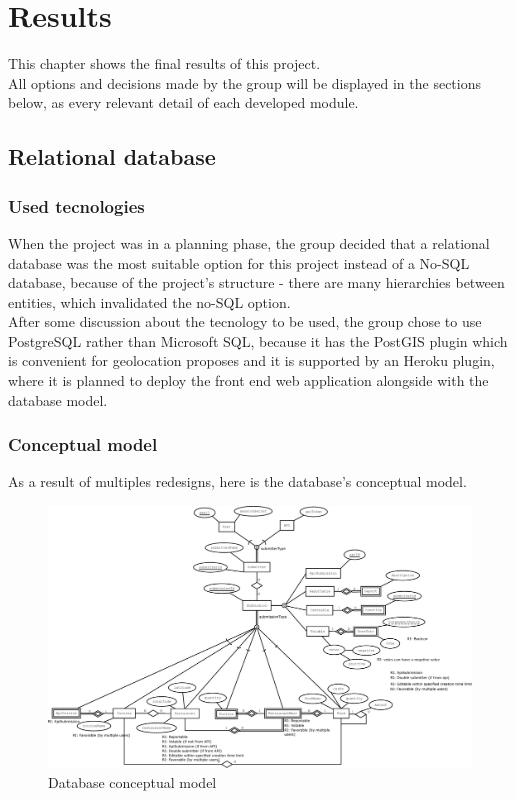 %
%
\chapter{Results}
This chapter shows the final results of this project.\\

All options and decisions made by the group will be displayed in the sections below, as every relevant detail of each developed module.

\newpage
\section{Relational database}

\subsection{Used tecnologies}

When the project was in a planning phase, the group decided that a relational database was the most suitable option for this project
instead of a No-SQL database, because of the project's structure - there are many hierarchies between entities, which invalidated the
no-SQL option.\\

After some discussion about the tecnology to be used, the group chose to use PostgreSQL rather than Microsoft SQL, because it has the
PostGIS plugin which is convenient for geolocation proposes and it is supported by an Heroku plugin, where it is planned to deploy the
front end web application alongside with the database model.\\

\subsection{Conceptual model}
As a result of multiples redesigns, here is the database's conceptual model.

\begin{figure}[H]    
    \includegraphics[scale=0.2]{_figures/Nutr.io_Database_Diagram.eps}
    \caption{Database conceptual model}
\end{figure}

